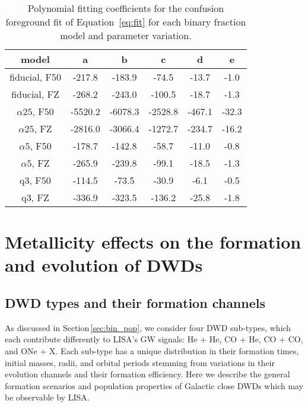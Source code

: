\documentclass[twocolumn, linenumbers]{aastex631}
\begin{document}
\begin{table}[]
    \centering
    \begin{tabular}{|c|c|c|c|c|c|}
       \hline
       model & a & b & c & d & e \\
       \hline
       \hline
       fiducial, F50 & -217.8 & -183.9 & -74.5 & -13.7 & -1.0 \\
       \hline
       fiducial, FZ & -268.2 & -243.0 & -100.5 & -18.7 & -1.3 \\
       \hline
       $\alpha25$, F50 & -5520.2 & -6078.3 & -2528.8 & -467.1 & -32.3 \\
       \hline
       $\alpha25$, FZ & -2816.0 & -3066.4 & -1272.7 & -234.7 & -16.2 \\
       \hline
       $\alpha5$, F50 & -178.7 & -142.8 & -58.7 & -11.0 & -0.8 \\
       \hline
       $\alpha5$, FZ & -265.9 & -239.8 & -99.1 & -18.5 & -1.3 \\
       \hline
       q3, F50 & -114.5 & -73.5 & -30.9 & -6.1 & -0.5 \\
       \hline
       q3, FZ & -336.9 & -323.5 & -136.2 & -25.8 & -1.8 \\
       \hline
    \end{tabular}
    \caption{Polynomial fitting coefficients for the confusion foreground fit of Equation~\ref{eq:fit} for each binary fraction model and parameter variation.}
    \label{tbl:fits}
\end{table}

\section{Metallicity effects on the formation and evolution of DWDs}\label{sec:results}

\subsection{DWD types and their formation channels}\label{sec:ini}
As discussed in Section\,\ref{sec:bin_pop}, we consider four DWD sub-types, which each contribute differently to LISA's GW signals: He + He, CO + He, CO + CO, and ONe + X. Each sub-type has a unique distribution in their formation times, initial masses, radii, and orbital periods stemming from variations in their evolution channels and their formation efficiency. Here we describe the general formation scenarios and population properties of Galactic close DWDs which may be observable by LISA.
\end{document}
